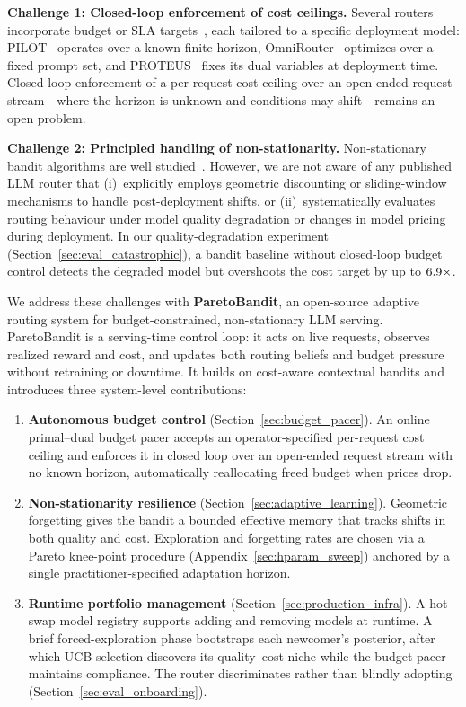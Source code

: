 \noindent\textbf{Challenge 1: Closed-loop enforcement of cost ceilings.}
Several routers incorporate budget or SLA targets~\cite{panda2025pilot, mei2025omnirouter, bhatti2026proteus}, each tailored to a specific deployment model: PILOT~\cite{panda2025pilot} operates over a known finite horizon, OmniRouter~\cite{mei2025omnirouter} optimizes over a fixed prompt set, and PROTEUS~\cite{bhatti2026proteus} fixes its dual variables at deployment time. Closed-loop enforcement of a per-request cost ceiling over an open-ended request stream---where the horizon is unknown and conditions may shift---remains an open problem.

\noindent\textbf{Challenge 2: Principled handling of non-stationarity.}
Non-stationary bandit algorithms are well studied~\cite{garivier2011switching, russac2019weighted}. However, we are not aware of any published LLM router that (i)~explicitly employs geometric discounting or sliding-window mechanisms to handle post-deployment shifts, or (ii)~systematically evaluates routing behaviour under model quality degradation or changes in model pricing during deployment. In our quality-degradation experiment (Section~\ref{sec:eval_catastrophic}), a bandit baseline without closed-loop budget control detects the degraded model but overshoots the cost target by up to $6.9\times$.

We address these challenges with \textbf{ParetoBandit}, an open-source adaptive routing system for budget-constrained, non-stationary LLM serving. ParetoBandit is a serving-time control loop: it acts on live requests, observes realized reward and cost, and updates both routing beliefs and budget pressure without retraining or downtime. It builds on cost-aware contextual bandits and introduces three system-level contributions:

\begin{enumerate}[nosep,leftmargin=*]
  \item \textbf{Autonomous budget control} (Section~\ref{sec:budget_pacer}). An online primal--dual budget pacer accepts an operator-specified per-request cost ceiling and enforces it in closed loop over an open-ended request stream with no known horizon, automatically reallocating freed budget when prices drop.

  \item \textbf{Non-stationarity resilience} (Section~\ref{sec:adaptive_learning}). Geometric forgetting gives the bandit a bounded effective memory that tracks shifts in both quality and cost. Exploration and forgetting rates are chosen via a Pareto knee-point procedure (Appendix~\ref{sec:hparam_sweep}) anchored by a single practitioner-specified adaptation horizon.

  \item \textbf{Runtime portfolio management} (Section~\ref{sec:production_infra}). A hot-swap model registry supports adding and removing models at runtime. A brief forced-exploration phase bootstraps each newcomer's posterior, after which UCB selection discovers its quality--cost niche while the budget pacer maintains compliance. The router discriminates rather than blindly adopting (Section~\ref{sec:eval_onboarding}).
\end{enumerate}

